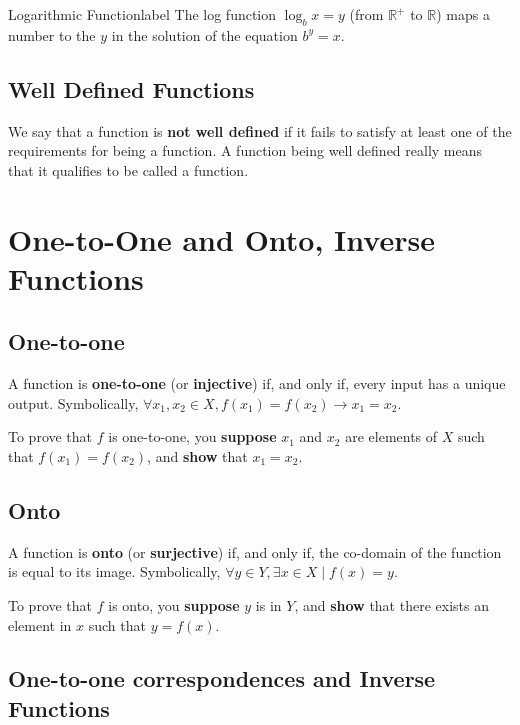 \documentclass[a4paper]{report}
\begin{document}
\begin{definition}{Logarithmic Function}{label}
    The log function $\log_b{x}=y$ (from $\mathbb{R}^{+}$ to $\mathbb{R}$) maps a number to the $y$ in the solution of
    the equation $b^y=x$.
\end{definition}

\subsection{Well Defined Functions}

We say that a function is \textbf{not well defined} if it fails to satisfy at least one of the
requirements for being a function. A function being well defined really means that it qualifies
to be called a function.

\section{One-to-One and Onto, Inverse Functions}

\subsection{One-to-one}

A function is \textbf{one-to-one} (or \textbf{injective}) if, and only if, every input has a unique 
output. Symbolically, $\forall x_1, x_2 \in X, f(x_1)=f(x_2) \to x_1 = x_2$.

To prove that $f$ is one-to-one, you \textbf{suppose} $x_1$ and $x_2$ are elements of $X$ such that
$f(x_1)=f(x_2)$, and \textbf{show} that $x_1=x_2$.

\subsection{Onto}

A function is \textbf{onto} (or \textbf{surjective}) if, and only if, the co-domain of the function
is equal to its image. Symbolically, $\forall y \in Y, \exists x \in X  \mid f(x) = y$.

To prove that $f$ is onto, you \textbf{suppose} $y$ is in $Y$, and \textbf{show} that
there exists an element in $x$ such that $y = f(x)$.

\subsection{One-to-one correspondences and Inverse Functions}
\end{document}
